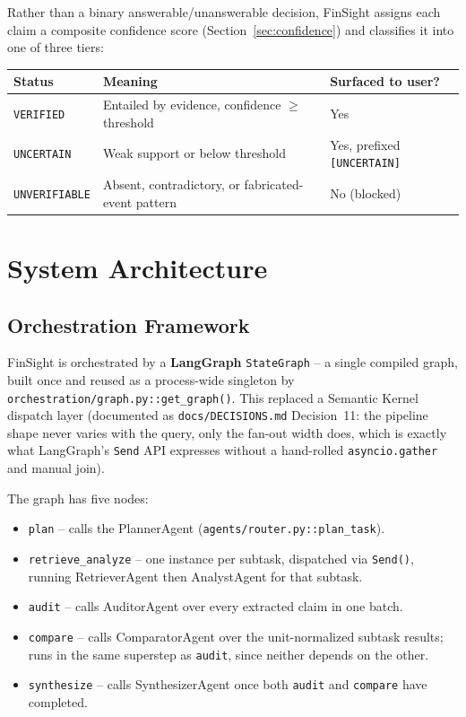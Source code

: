 \documentclass[11pt,a4paper]{report}
\newcommand{\code}[1]{\texttt{#1}}
\newcommand{\file}[1]{\texttt{\small #1}}
\begin{document}
Rather than a binary answerable/unanswerable decision, FinSight assigns each claim a
composite confidence score (Section~\ref{sec:confidence}) and classifies it into one of
three tiers:

\begin{center}
\begin{tabular}{@{}lll@{}}
\toprule
\textbf{Status} & \textbf{Meaning} & \textbf{Surfaced to user?} \\
\midrule
\texttt{VERIFIED} & Entailed by evidence, confidence $\geq$ threshold & Yes \\
\texttt{UNCERTAIN} & Weak support or below threshold & Yes, prefixed \texttt{[UNCERTAIN]} \\
\texttt{UNVERIFIABLE} & Absent, contradictory, or fabricated-event pattern & No (blocked) \\
\bottomrule
\end{tabular}
\end{center}

\chapter{System Architecture}

\section{Orchestration Framework}

FinSight is orchestrated by a \textbf{LangGraph} \code{StateGraph} -- a single
compiled graph, built once and reused as a process-wide singleton by
\file{orchestration/graph.py}\code{::get\_graph()}. This replaced a Semantic Kernel
dispatch layer (documented as \code{docs/DECISIONS.md} Decision~11: the pipeline shape
never varies with the query, only the fan-out width does, which is exactly what
LangGraph's \code{Send} API expresses without a hand-rolled \code{asyncio.gather} and
manual join).

The graph has five nodes:

\begin{itemize}
    \item \code{plan} -- calls the PlannerAgent (\code{agents/router.py::plan\_task}).
    \item \code{retrieve\_analyze} -- one instance per subtask, dispatched via
    \code{Send()}, running RetrieverAgent then AnalystAgent for that subtask.
    \item \code{audit} -- calls AuditorAgent over every extracted claim in one batch.
    \item \code{compare} -- calls ComparatorAgent over the unit-normalized subtask
    results; runs in the same superstep as \code{audit}, since neither depends on the
    other.
    \item \code{synthesize} -- calls SynthesizerAgent once both \code{audit} and
    \code{compare} have completed.
\end{itemize}
\end{document}
